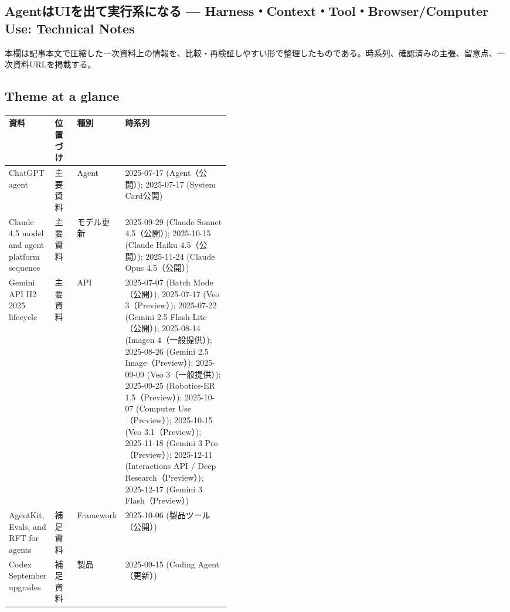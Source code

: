 \subsection*{AgentはUIを出て実行系になる — Harness・Context・Tool・Browser/Computer Use: Technical Notes}
本欄は記事本文で圧縮した一次資料上の情報を、比較・再検証しやすい形で整理したものである。時系列、確認済みの主張、留意点、一次資料URLを掲載する。
\medskip
\subsection*{Theme at a glance}
\begin{center}
\footnotesize
\begin{tabularx}{\linewidth}{@{}p{0.20\linewidth}p{0.10\linewidth}p{0.14\linewidth}X@{}}
\toprule
資料 & 位置づけ & 種別 & 時系列 \\
\midrule
ChatGPT agent & 主要資料 & Agent & 2025-07-17 (Agent（公開）); 2025-07-17 (System Card公開)      \\
Claude 4.5 model and agent platform sequence & 主要資料 & モデル更新 & 2025-09-29 (Claude Sonnet 4.5（公開）); 2025-10-15 (Claude Haiku 4.5（公開）); 2025-11-24 (Claude Opus 4.5（公開）)      \\
Gemini API H2 2025 lifecycle & 主要資料 & API & 2025-07-07 (Batch Mode（公開）); 2025-07-17 (Veo 3（Preview）); 2025-07-22 (Gemini 2.5 Flash-Lite（公開）); 2025-08-14 (Imagen 4（一般提供）); 2025-08-26 (Gemini 2.5 Image（Preview）); 2025-09-09 (Veo 3（一般提供）); 2025-09-25 (Robotics-ER 1.5（Preview）); 2025-10-07 (Computer Use（Preview）); 2025-10-15 (Veo 3.1（Preview）); 2025-11-18 (Gemini 3 Pro（Preview）); 2025-12-11 (Interactions API / Deep Research（Preview）); 2025-12-17 (Gemini 3 Flash（Preview）)      \\
AgentKit, Evals, and RFT for agents & 補足資料 & Framework & 2025-10-06 (製品ツール（公開）)      \\
Codex September upgrades & 補足資料 & 製品 & 2025-09-15 (Coding Agent（更新）)      \\
\bottomrule
\end{tabularx}
\end{center}
\normalsize

